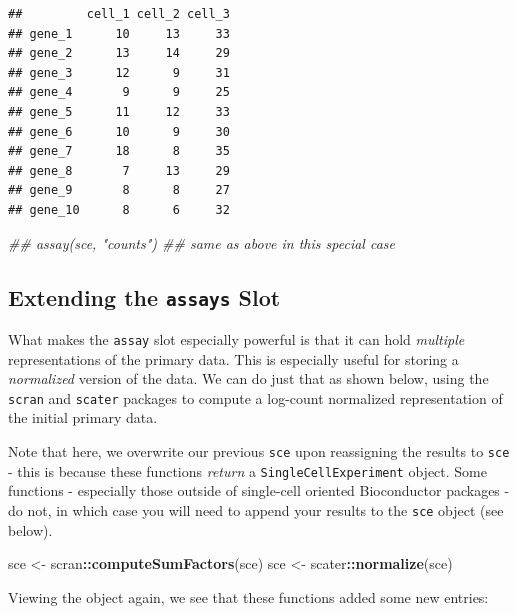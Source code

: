 \documentclass[]{book}
\newenvironment{Shaded}{\begin{snugshade}}{\end{snugshade}}
\newcommand{\CommentTok}[1]{\textcolor[rgb]{0.56,0.35,0.01}{\textit{#1}}}
\newcommand{\KeywordTok}[1]{\textcolor[rgb]{0.13,0.29,0.53}{\textbf{#1}}}
\newcommand{\NormalTok}[1]{#1}
\newcommand{\OperatorTok}[1]{\textcolor[rgb]{0.81,0.36,0.00}{\textbf{#1}}}
\newcommand{\StringTok}[1]{\textcolor[rgb]{0.31,0.60,0.02}{#1}}
\begin{document}
\begin{verbatim}
##         cell_1 cell_2 cell_3
## gene_1      10     13     33
## gene_2      13     14     29
## gene_3      12      9     31
## gene_4       9      9     25
## gene_5      11     12     33
## gene_6      10      9     30
## gene_7      18      8     35
## gene_8       7     13     29
## gene_9       8      8     27
## gene_10      8      6     32
\end{verbatim}

\begin{Shaded}
\begin{Highlighting}[]
\CommentTok{## assay(sce, "counts") ## same as above in this special case}
\end{Highlighting}
\end{Shaded}

\hypertarget{extending-the-assays-slot}{%
\subsection{\texorpdfstring{Extending the \texttt{assays} Slot}{Extending the assays Slot}}\label{extending-the-assays-slot}}

What makes the \texttt{assay} slot especially powerful is that it can hold \emph{multiple} representations of the primary data. This is especially useful for storing a \emph{normalized} version of the data. We can do just that as shown below, using the \texttt{scran} and \texttt{scater} packages to compute a log-count normalized representation of the initial primary data.

Note that here, we overwrite our previous \texttt{sce} upon reassigning the results to \texttt{sce} - this is because these functions \emph{return} a \texttt{SingleCellExperiment} object. Some functions - especially those outside of single-cell oriented Bioconductor packages - do not, in which case you will need to append your results to the \texttt{sce} object (see below).

\begin{Shaded}
\begin{Highlighting}[]
\NormalTok{sce <-}\StringTok{ }\NormalTok{scran}\OperatorTok{::}\KeywordTok{computeSumFactors}\NormalTok{(sce)}
\NormalTok{sce <-}\StringTok{ }\NormalTok{scater}\OperatorTok{::}\KeywordTok{normalize}\NormalTok{(sce)}
\end{Highlighting}
\end{Shaded}

Viewing the object again, we see that these functions added some new entries:
\end{document}
